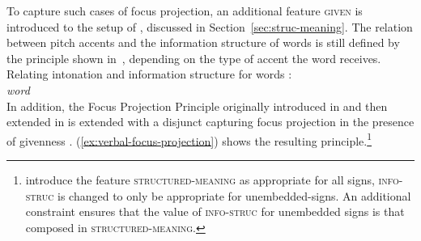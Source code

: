 \documentclass[output=paper,biblatex,babelshorthands,newtxmath,draftmode,colorlinks,citecolor=brown]{langscibook}
\begin{document}
To capture such cases of focus projection, an additional feature
\textsc{given} is introduced to the setup of
\citet{deKuthy2002a}, discussed in Section~\ref{sec:struc-meaning}. The
relation between pitch accents and the information structure of words
is still defined by the principle shown in~,
depending on the type of accent the word receives.
\ea
Relating intonation and information structure for words \citep[]{DeKuthy.Meurers-11}:\\
    \emph{word}\quad \impl \\
    \label{fig:words2}
\z
In addition, the Focus Projection Principle originally introduced in  and then extended in  is extended with a disjunct capturing focus
projection in the presence of givenness
\citep{DeKuthy.Meurers-11}. (\ref{ex:verbal-focus-projection}) shows the resulting
principle.\footnote{ \citet[293]{DeKuthy.Meurers-11} introduce the feature
  \textsc{structured-meaning} as appropriate for all signs, \textsc{info-struc} is changed to only
  be appropriate for unembedded-signs. An additional constraint ensures that the value of
  \textsc{info-struc} for unembedded signs is that composed in
  \textsc{structured-meaning}.
}
\end{document}
